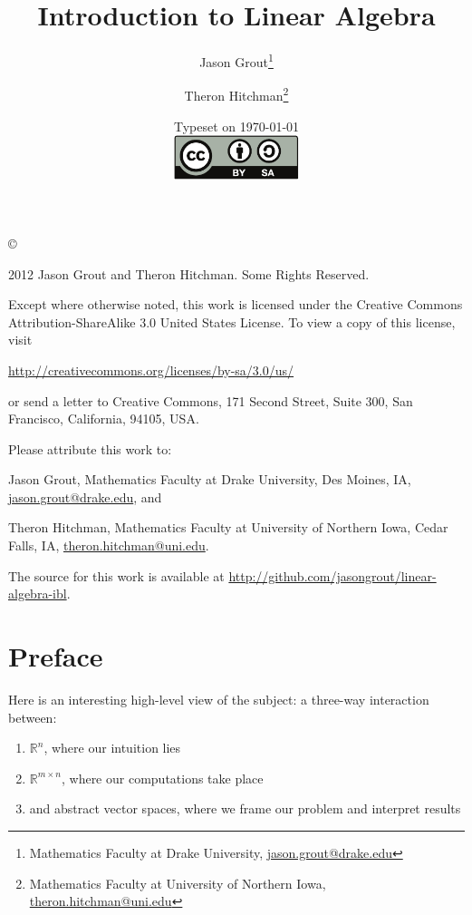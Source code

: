 \documentclass[letterpaper,oneside]{book}%
\theoremstyle{plain}
\theoremstyle{box}
\theoremstyle{problem}
\newcommand{\RR}{\ensuremath{\mathbb{R}}}
\begin{document}
\frontmatter
\title{Introduction to Linear Algebra}
\author{Jason Grout\thanks{Mathematics Faculty at Drake University,
    \url{jason.grout@drake.edu}} \and Theron
    Hitchman\thanks{Mathematics Faculty at University of Northern
      Iowa, \url{theron.hitchman@uni.edu}}}
\date{Typeset on \today\\
\vfill
\includegraphics[height=1.3cm]{by-sa}
\vfill}
\maketitle
\thispagestyle{empty}

\noindent\copyright{ 2012 Jason Grout and Theron Hitchman.  Some Rights Reserved.\\

\bigskip

\noindent Except where otherwise noted, this work is licensed under the Creative Commons
Attribution-ShareAlike 3.0 United States License. To view a copy of
this license, visit 
\begin{center}
  \url{http://creativecommons.org/licenses/by-sa/3.0/us/}
\end{center}
or send a letter to Creative Commons, 171 Second Street, Suite 300,
San Francisco, California, 94105, USA.

\bigskip

\noindent Please attribute this work to:
\smallskip

 Jason Grout, Mathematics Faculty at Drake University, Des Moines, IA,
 \url{jason.grout@drake.edu}, and

\smallskip

 Theron Hitchman, Mathematics Faculty at University of Northern Iowa,
 Cedar Falls, IA, \url{theron.hitchman@uni.edu}.

\vfill 

The source for this work is available at \url{http://github.com/jasongrout/linear-algebra-ibl}.
\vfill
}
\tableofcontents

\mainmatter

\chapter*{Preface}

Here is an interesting high-level view of the subject: a three-way
interaction between:
\begin{enumerate}
\item $\RR^n$, where our intuition lies
\item $\RR^{m\times n}$, where our computations take place
\item and abstract vector spaces, where we frame our problem and
  interpret results
\end{enumerate}









\end{document}
